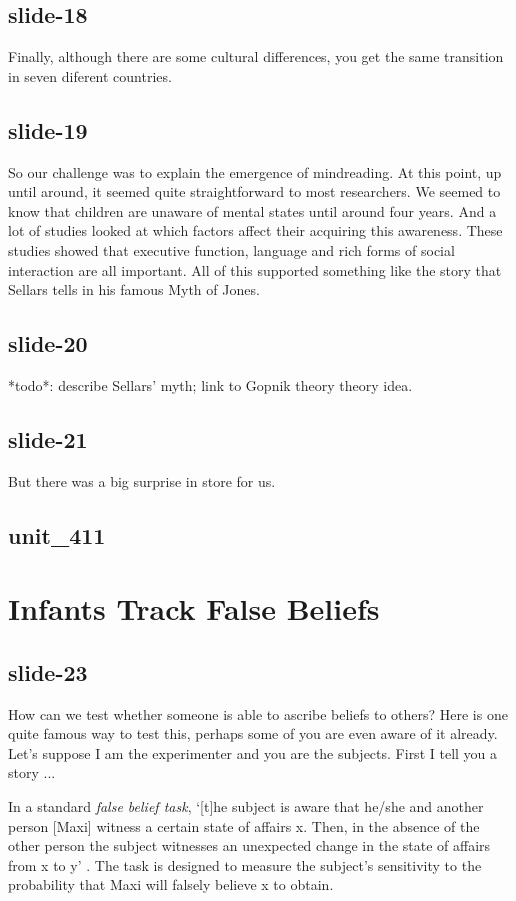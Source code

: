\documentclass[12pt,\papersize]{extarticle}
\begin{document}
\subsection{slide-18}
Finally, although there are some cultural differences, you get the same transition in seven diferent countries.

\subsection{slide-19}
So our challenge was to explain the emergence of mindreading.
At this point, up until around, it seemed quite straightforward to most researchers.
We seemed to know that children are unaware of mental states until around four years.
And a lot of studies looked at which factors affect their acquiring this awareness.
These studies showed that executive function, language and rich forms of social
interaction are all important.
All of this supported something like the story that Sellars tells in his famous Myth of
Jones.

\subsection{slide-20}
*todo*: describe Sellars' myth; link to Gopnik theory theory idea.

\subsection{slide-21}
But there was a big surprise in store for us.

\subsection{unit\_411}


\section{Infants Track False Beliefs}

\subsection{slide-23}
How can we test whether someone is able to ascribe beliefs to others?
Here is one quite famous way to test this, perhaps some of you are even aware of it
already.
Let's suppose I am the experimenter and you are the subjects.
First I tell you a story ...

In a standard \textit{false belief task}, `[t]he subject is aware that he/she and
another person [Maxi] witness a certain state of affairs x. Then, in the absence of
the other person the subject witnesses an unexpected change in the state of affairs
from x to y' \citep[p.\ 106]{Wimmer:1983dz}. The task is designed to measure the
subject's sensitivity to the probability that Maxi will falsely believe x to obtain.
\end{document}
